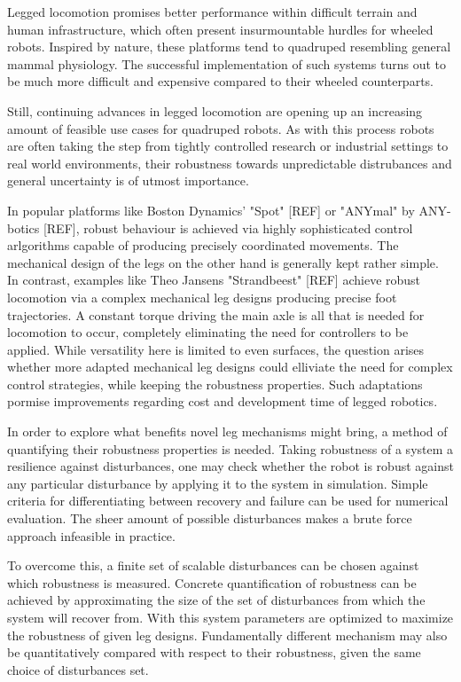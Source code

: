 Legged locomotion promises better performance within difficult terrain and human infrastructure, which often present insurmountable hurdles for wheeled robots. Inspired by nature, these platforms tend to quadruped resembling general mammal physiology. The successful implementation of such systems turns out to be much more difficult and expensive compared to their wheeled counterparts. 

Still, continuing advances in legged locomotion are opening up an increasing amount of feasible use cases for quadruped robots. As with this process robots are often taking the step from tightly controlled research or industrial settings to real world environments, their robustness towards unpredictable distrubances and general uncertainty is of utmost importance. 

In popular platforms like Boston Dynamics' "Spot" [REF] or "ANYmal" by ANY-botics [REF], robust behaviour is achieved via highly sophisticated control arlgorithms capable of producing precisely coordinated movements. The mechanical design of the legs on the other hand is generally kept rather simple. In contrast, examples like Theo Jansens "Strandbeest" [REF] achieve robust locomotion via a complex mechanical leg designs producing precise foot trajectories. A constant torque driving the main axle is all that is needed for locomotion to occur, completely eliminating the need for controllers to be applied.   
While versatility here is limited to even surfaces, the question arises whether more adapted mechanical leg designs could elliviate the need for complex control strategies, while keeping the robustness properties. Such adaptations pormise improvements regarding cost and development time of legged robotics.

In order to explore what benefits novel leg mechanisms might bring, a method of quantifying their robustness properties is needed. Taking robustness of a system a resilience against disturbances, one may check whether the robot is robust against any particular disturbance by applying it to the system in simulation. Simple criteria for differentiating between recovery and failure can be used for numerical evaluation. The sheer amount of possible disturbances makes a brute force approach infeasible in practice. 

To overcome this, a finite set of scalable disturbances can be chosen against which robustness is measured. Concrete quantification of robustness can be achieved by approximating the size of the set of disturbances from which the system will recover from. 
With this system parameters are optimized to maximize the robustness of given leg designs. Fundamentally different mechanism may also be quantitatively compared with respect to their robustness, given the same choice of disturbances set.

